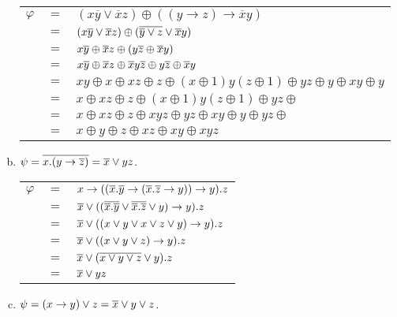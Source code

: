 \begin{solution}
\begin{enumerate}[a)]
    \begin{tabular}{l c l}
      $\varphi$ & $=$ & $(x\overline{y}\vee \overline{x}z)\oplus ((y\rightarrow z)\rightarrow \overline{x}y)$\\
      & $=$ & $(x\overline{y}\vee \overline{x}z) \oplus (\overline{\overline{y}\vee z} \vee \overline{x}y)$ \\
      & $=$ & $x\overline{y}\oplus \overline{x}z \oplus (y\overline{z} \oplus \overline{x}y)$ \\
      & $=$ & $x\overline{y}\oplus \overline{x}z\oplus \overline{x}y\overline{z} \oplus y\overline{z} \oplus \overline{x}y$ \\
      & $=$ & $xy \oplus x \oplus xz \oplus z \oplus (x\oplus 1)y(z\oplus 1) \oplus yz\oplus y \oplus xy \oplus y$ \\
      & $=$ & $x \oplus xz \oplus z \oplus (x\oplus 1)y(z\oplus 1) \oplus yz\oplus $ \\
      & $=$ & $x \oplus xz \oplus z \oplus xyz \oplus yz \oplus xy \oplus y \oplus yz\oplus $ \\
      & $=$ & $x \oplus y\oplus z \oplus xz \oplus xy \oplus xyz$ \\
     \end{tabular}
     
   \item
     $\psi = \overline{x.(y\rightarrow\overline{z})} = \overline{x}\vee yz$.
     
     \begin{tabular}{l c l}
       $\varphi$ & $ = $ & $x\rightarrow ((\overline{x}.\overline{y}\rightarrow(\overline{x}.\overline{z}\rightarrow y))\rightarrow y).z$\\
       & $=$ & $\overline{x} \vee ((\overline{\overline{x}.\overline{y}} \vee \overline{\overline{x}.\overline{z}}\vee y)\rightarrow y).z$\\
       & $=$ & $\overline{x} \vee ((x\vee y \vee x\vee z \vee y)\rightarrow y).z$\\
       & $=$ & $\overline{x} \vee ((x\vee y \vee z)\rightarrow y).z$\\
       & $=$ & $\overline{x} \vee (\overline{x\vee y \vee z}\vee y).z$\\
       & $=$ & $\overline{x} \vee yz$
     \end{tabular}

     
  \item
    $\psi = (x\rightarrow y)\vee z = \overline{x}\vee y \vee z$.
    

\end{enumerate}
\end{solution}
